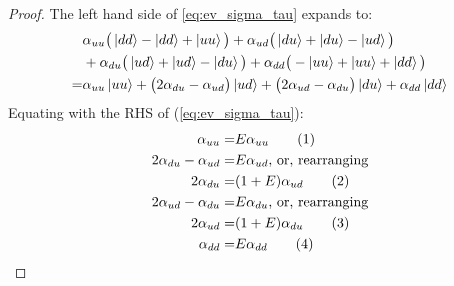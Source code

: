 \documentclass[]{article}
\newcommand\numberthis{\addtocounter{equation}{1}\tag{\theequation}}
\begin{document}
\begin{proof}
 	The left hand side of \eqref{eq:ev_sigma_tau} expands to:
	\begin{align*}
		& \alpha_{uu}\big(\ket{dd} - \ket{dd} + \ket{uu}\big) + \alpha_{ud}\big(\ket{du} +\ket{du} - \ket{ud}\big)\\
		&+\alpha_{du}\big(\ket{ud} +\ket{ud} - \ket{du}\big) + \alpha_{dd}\big(-\ket{uu} + \ket{uu} +\ket{dd}\big)\\
		=&  \alpha_{uu} \ket{uu} + \big( 2 \alpha_{du} - \alpha_{ud}\big)\ket{ud} + \big( 2 \alpha_{ud} - \alpha_{du} \big)\ket{du}+ \alpha_{dd}\ket{dd}	
	\end{align*}
	Equating with the RHS of (\ref{eq:ev_sigma_tau}):
	\begin{align*}
		\alpha_{uu} =& E \alpha_{uu} \numberthis \label{eq:alpha:uu}\\
		 2 \alpha_{du} - \alpha_{ud} =& E \alpha_{ud} \text{, or, rearranging}\\
		  2 \alpha_{du} =& (1+E) \alpha_{ud} \numberthis \label{eq:alpha:ud}\\
		 2 \alpha_{ud} - \alpha_{du}=& E \alpha_{du}\text{, or, rearranging}\\
		 2 \alpha_{ud} =& (1+E)\alpha_{du} \numberthis \label{eq:alpha:du}\\
		 \alpha_{dd} =& E \alpha_{dd} \numberthis \label{eq:alpha:dd}
	\end{align*}


\end{proof}
\end{document}
